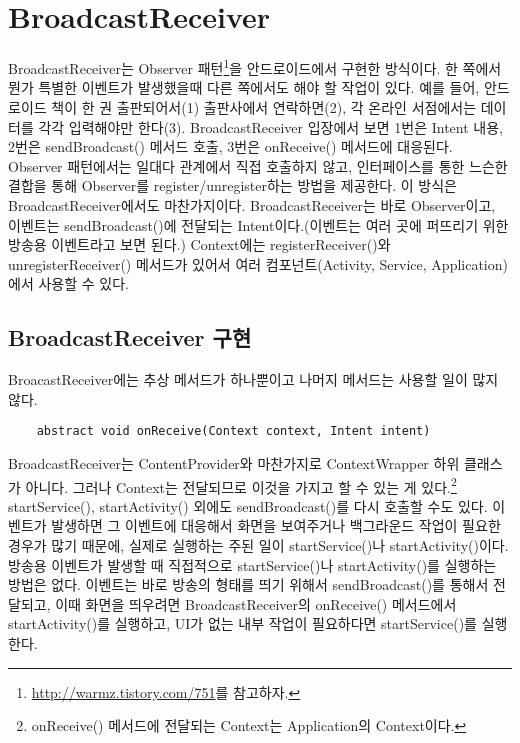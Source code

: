 \chapter{BroadcastReceiver}
BroadcastReceiver는 Observer 패턴\footnote{\url{http://warmz.tistory.com/751}를 참고하자.}을 안드로이드에서 구현한 방식이다.
한 쪽에서 뭔가 특별한 이벤트가 발생했을때 다른 쪽에서도 해야 할 작업이 있다.
예를 들어, 안드로이드 책이 한 권 출판되어서(1) 출판사에서 연락하면(2), 각 온라인 서점에서는 데이터를 각각 입력해야만 한다(3). BroadcastReceiver 입장에서 보면 1번은 Intent 내용, 2번은 sendBroadcast() 메서드 호출, 3번은 onReceive() 메서드에 대응된다.\\

Observer 패턴에서는 일대다 관계에서 직접 호출하지 않고, 인터페이스를 통한 느슨한 결합을 통해 Observer를 register/unregister하는 방법을 제공한다.
이 방식은 BroadcastReceiver에서도 마찬가지이다. BroadcastReceiver는 바로 Observer이고, 이벤트는 sendBroadcast()에 전달되는 Intent이다.(이벤트는 여러 곳에 퍼뜨리기 위한 방송용 이벤트라고 보면 된다.) Context에는 registerReceiver()와 unregisterReceiver() 메서드가 있어서 여러 컴포넌트(Activity, Service, Application)에서 사용할 수 있다.

\section{BroadcastReceiver 구현}
BroacastReceiver에는 추상 메서드가 하나뿐이고 나머지 메서드는 사용할 일이 많지 않다.
\begin{verbatim}
	abstract void onReceive(Context context, Intent intent)
\end{verbatim}

BroadcastReceiver는 ContentProvider와 마찬가지로 ContextWrapper 하위 클래스가 아니다. 그러나 Context는 전달되므로 이것을 가지고 할 수 있는 게 있다.\footnote{onReceive() 메서드에 전달되는 Context는 Application의 Context이다.}
startService(), startActivity() 외에도 sendBroadcast()를 다시 호출할 수도 있다. 
이벤트가 발생하면 그 이벤트에 대응해서 화면을 보여주거나 백그라운드 작업이 필요한 경우가 많기 때문에, 실제로 실행하는 주된 일이 startService()나 startActivity()이다. \\

방송용 이벤트가 발생할 때 직접적으로 startService()나 startActivity()를 실행하는 방법은 없다. 이벤트는 바로 방송의 형태를 띄기 위해서 sendBroadcast()를 통해서 전달되고, 이때 화면을 띄우려면 BroadcastReceiver의 onReceive() 메서드에서 startActivity()를 실행하고, UI가 없는 내부 작업이 필요하다면 startService()를 실행한다.\\

